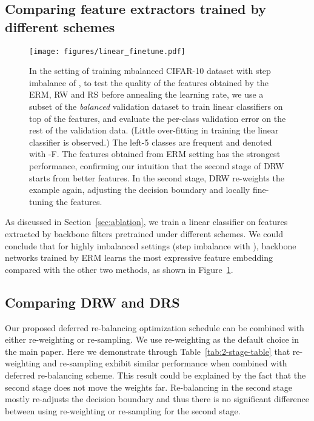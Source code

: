 \documentclass{article}
\newcommand{\tstagew}{DRW}
\newcommand{\ERM}{ERM}
\begin{document}
\subsection{Comparing feature extractors trained by different schemes} \label{sec:feature_extractor}

\begin{figure}
     \centering
     \texttt{[image: figures/linear\_finetune.pdf]}
     \caption{In the setting of training mbalanced CIFAR-10 dataset with step imbalance of , to test the quality of the features obtained by the ERM, RW and RS before annealing the learning rate, we use a subset of the \textit{balanced} validation dataset to train linear classifiers on top of the features, and evaluate the per-class validation error on the rest of the validation data. (Little over-fitting in training the linear classifier is observed.) The left-5 classes are frequent and denoted with -F. The features obtained from ERM setting has the strongest performance, confirming our intuition that the second stage of \tstagew{} starts from better features. In the second stage, \tstagew{} re-weights the example again, adjusting the decision boundary and locally fine-tuning the features.}
     \label{fig:linear_finetune}
\end{figure}

As discussed in Section~\ref{sec:ablation}, we train a linear classifier on features extracted by backbone filters pretrained under different schemes. We could conclude that for highly imbalanced settings (step imbalance with ), backbone networks trained by \ERM{} learns the most expressive feature embedding compared with the other two methods, as shown in Figure~\ref{fig:linear_finetune}.

\subsection{Comparing DRW and DRS}

Our proposed deferred re-balancing optimization schedule can be combined with either re-weighting or re-sampling. We use re-weighting as the default choice in the main paper. Here we demonstrate through Table~\ref{tab:2-stage-table} that re-weighting and re-sampling exhibit similar performance when combined with deferred re-balancing scheme. This result could be explained by the fact that the second stage does not move the weights far. Re-balancing in the second stage mostly re-adjusts the decision boundary and thus there is no significant difference between using re-weighting or re-sampling for the second stage.
\end{document}

